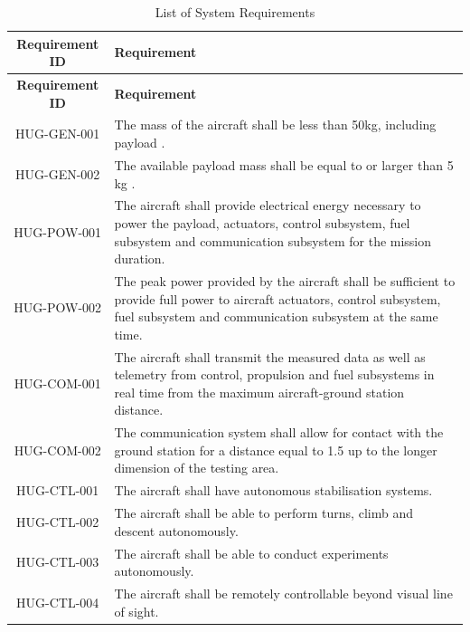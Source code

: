 \begin{longtable}{|c|p{13cm}|}
\caption{List of System Requirements}
\label{tab:system_requirements} \\
\hline
\textbf{Requirement ID} & \textbf{Requirement} \\
\hline
\endfirsthead

\hline
\textbf{Requirement ID} & \textbf{Requirement} \\
\hline
\endhead

HUG-GEN-001& The mass of the aircraft shall be less than 50kg, including payload \cite{Castro2026}. \\ \hline

HUG-GEN-002 & The available payload mass shall be equal to or larger than 5 kg \cite{Castro2026}. \\ \hline



HUG-POW-001& The aircraft shall provide electrical energy necessary to power the payload, actuators, control subsystem, fuel subsystem and communication subsystem for the mission duration.\\ \hline 

HUG-POW-002& The peak power provided by the aircraft shall be sufficient to provide full power to aircraft actuators, control subsystem, fuel subsystem and communication subsystem at the same time.\\ \hline 

HUG-COM-001 & The aircraft shall transmit the measured data as well as telemetry from control, propulsion and fuel subsystems in real time from the maximum aircraft-ground station distance.\\ \hline

HUG-COM-002 & The communication system shall allow for contact with the ground station for a distance equal to 1.5 up to the longer dimension of the testing area. \\ \hline


HUG-CTL-001& The aircraft shall have autonomous stabilisation systems.\\ \hline

HUG-CTL-002& The aircraft shall be able to perform turns, climb and descent autonomously.\\ \hline

HUG-CTL-003& The aircraft shall be able to conduct experiments autonomously.\\ \hline

HUG-CTL-004& The aircraft shall be remotely controllable beyond visual line of sight. \\ \hline


\end{longtable}
